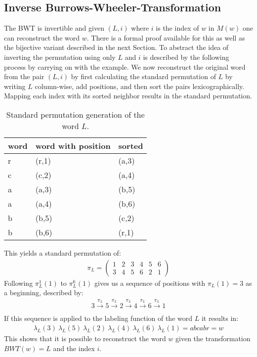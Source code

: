 \subsection{Inverse Burrows-Wheeler-Transformation}
\label{ch:Principles of compression:sec:Other:subSec:bwtInverse}
\par{
 The BWT is invertible and given $(L, i)$ where $i$ is the index of $w$ in $M(w)$ one can reconstruct the word $w$. There is a formal proof \cite{kufleitner2009bijective} available for this as well as the bijective variant described in the next Section. To abstract the idea of inverting the permutation using only $L$ and $i$ is described by the following process by carrying on with the example. We now reconstruct the original word from the pair $(L,i)$ by first calculating the standard permutation of $L$ by writing $L$ column-wise, add positions, and then sort the pairs lexicographically. Mapping each index with its sorted neighbor results in the standard permutation.  
 \begin{table}[h]
 	\centering
 	\begin{tabular}{l|l|l}
		word & word with position & sorted\\
		\hline
		r & (r,1) & (a,3) \\
		c & (c,2) & (a,4) \\
		a & (a,3) & (b,5) \\
		a & (a,4) & (b,6) \\
		b & (b,5) & (c,2) \\
		b & (b,6) & (r,1)
 		\label{tab:t11 standard permutation}
 	\end{tabular}
 	\caption{Standard permutation generation of the word $L$.}
 \end{table}
}
\par{
This yields a standard permutation of:
\begin{gather}  
\pi_L = 
\begin{pmatrix} 1 & 2 & 3 & 4 & 5 & 6\\ 3 & 4 & 5 & 6 & 2 & 1 \end{pmatrix}
\end{gather}
Following $\pi^1_L(1)$ to $\pi^6_L(1)$ gives us a sequence of positions with $\pi_L(1)=3$ as a beginning, described by:
\begin{gather} 
3 \xrightarrow[]{\pi_L} 5 \xrightarrow[]{\pi_L} 2 \xrightarrow[]{\pi_L} 4 \xrightarrow[]{\pi_L} 6 \xrightarrow[]{\pi_L} 1 
\end{gather}
If this sequence is applied to the labeling function of the word $L$ it results in: 
\begin{gather}  
\lambda_L(3) \: \lambda_L(5) \: \lambda_L(2) \: \lambda_L(4) \: \lambda_L(6) \: \lambda_L(1)
= abcabr = w
\end{gather}
This shows that it is possible to reconstruct the word $w$ given the transformation $BWT(w)=L$ and the index $i$.
}

